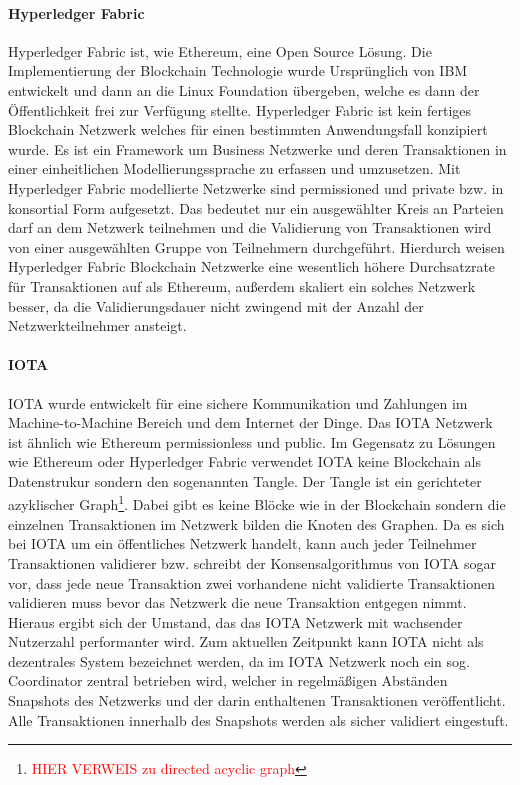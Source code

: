 \paragraph{Hyperledger Fabric}
Hyperledger Fabric ist, wie Ethereum, eine Open Source Lö\-sung. Die Implementierung der Blockchain Technologie wurde Ursprünglich von IBM entwickelt und dann an die Linux Foundation übergeben, welche es dann der Öffentlichkeit frei zur Verfügung stellte. Hyperledger Fabric ist kein fertiges Blockchain Netzwerk welches für einen bestimmten Anwendungsfall konzipiert wurde. Es ist ein Framework um Business Netzwerke und deren Transaktionen in einer einheitlichen Modellierungssprache zu erfassen und umzusetzen. Mit Hyperledger Fabric modellierte Netzwerke sind permissioned und private bzw. in konsortial Form aufgesetzt. Das bedeutet nur ein ausgewählter Kreis an Parteien darf an dem Netzwerk teilnehmen und die Validierung von Transaktionen wird von einer ausgewählten Gruppe von Teilnehmern durchgeführt. Hierdurch weisen Hyperledger Fabric Blockchain Netzwerke eine wesentlich höhere Durchsatzrate für Transaktionen auf als Ethereum, außerdem skaliert ein solches Netzwerk besser, da die Validierungsdauer nicht zwingend mit der Anzahl der Netzwerkteilnehmer ansteigt.

\paragraph{IOTA}
IOTA wurde entwickelt für eine sichere Kommunikation und Zahlungen im Machine-to-Machine Bereich und dem Internet der Dinge. Das IOTA Netzwerk ist ähnlich wie Ethereum permissionless und public. Im Gegensatz zu Lösungen wie Ethereum oder Hyperledger Fabric verwendet IOTA keine Blockchain als Datenstrukur sondern den sogenannten \glqq Tangle\grqq{}. Der Tangle ist ein gerichteter azyklischer Graph\footnote{\textcolor{red}{HIER VERWEIS zu directed acyclic graph}}. Dabei gibt es keine Blöcke wie in der Blockchain sondern die einzelnen Transaktionen im Netzwerk bilden die Knoten des Graphen. Da es sich bei IOTA um ein öffentliches Netzwerk handelt, kann auch jeder Teilnehmer Transaktionen validierer bzw. schreibt der Konsensalgorithmus von IOTA sogar vor, dass jede neue Transaktion zwei vorhandene nicht validierte Transaktionen validieren muss bevor das Netzwerk die neue Transaktion entgegen nimmt. Hieraus ergibt sich der Umstand, das das IOTA Netzwerk mit wachsender Nutzerzahl performanter wird. Zum aktuellen Zeitpunkt kann IOTA nicht als dezentrales System bezeichnet werden, da im IOTA Netzwerk noch ein sog. Coordinator zentral betrieben wird, welcher in regelmäßigen Abständen Snapshots des Netzwerks und der darin enthaltenen Transaktionen veröffentlicht. Alle Transaktionen innerhalb des Snapshots werden als sicher validiert eingestuft.

